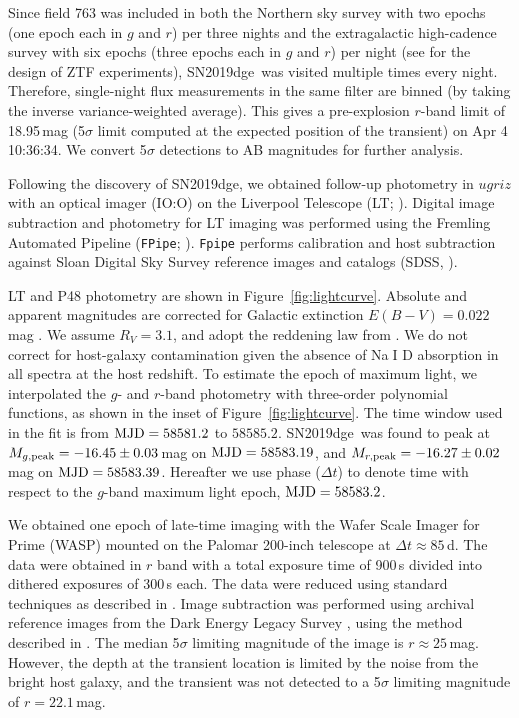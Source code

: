 \documentclass[twocolumn]{aastex63}
\newcommand{\name}{SN2019dge}
\def\ion#1#2{#1$\;${\footnotesize\rm{#2}}\relax}
\begin{document}
Since field 763 was included in both the Northern sky survey with two epochs (one epoch each in $g$ 
and $r$) per three nights and the extragalactic high-cadence survey with six epochs (three epochs 
each in $g$ and $r$) per night (see \citealt{Bellm2019a} for the design of ZTF experiments), \name\ was 
visited multiple times every night. Therefore, single-night flux measurements in the same 
filter are binned (by taking the inverse variance-weighted average). This gives a pre-explosion 
$r$-band limit of 18.95\,mag (5$\sigma$ limit computed at the expected position of the transient) on 
Apr 4 10:36:34. We convert 5$\sigma$ detections to AB magnitudes for further analysis.

Following the discovery of \name, we obtained follow-up photometry in $ugriz$ with an optical 
imager (IO:O) on the Liverpool Telescope (LT; \citealt{Steele2004}). Digital image subtraction and 
photometry for LT imaging was performed using the Fremling Automated Pipeline (\texttt{FPipe}; 
\citealt{Fremling2016}). \texttt{Fpipe} performs calibration and host subtraction against Sloan Digital 
Sky Survey reference images and catalogs (SDSS, \citealt{Alam2015}).

LT and P48 photometry are shown in Figure~\ref{fig:lightcurve}. Absolute and apparent magnitudes are 
corrected for Galactic extinction $E(B-V)=0.022$\,mag \citep{Schlafly2011}. We assume $R_V=3.1$, 
and adopt the reddening law from \citet{Cardelli1989}. We do not correct for host-galaxy 
contamination given the absence of \ion{Na}{I} D absorption in all spectra at the host redshift. To 
estimate the epoch of maximum light, we interpolated the $g$- and $r$-band photometry with 
three-order polynomial functions, as shown in the inset of Figure~\ref{fig:lightcurve}. The time 
window used in the fit is from ${\rm MJD}=58581.2$ to $58585.2$. \name\ was found to peak 
at $M_{g\rm , peak}=-16.45\pm0.03$\,mag on ${\rm MJD}=58583.19$, and $M_{r \rm ,peak} 
=-16.27\pm0.02$\,mag on ${\rm MJD}=58583.39$. Hereafter we use phase ($\Delta t$) to denote time
with respect to the $g$-band maximum light epoch, ${\rm MJD}=58583.2$.

We obtained one epoch of late-time imaging with the Wafer Scale Imager for Prime (WASP) mounted 
on the Palomar 200-inch telescope at $\Delta t \approx 85$\,d. The data were obtained 
in $r$ band with a total exposure time of 900\,s divided into dithered exposures of 300\,s each. The 
data were reduced using standard techniques as described in \citet{De2020a}. Image subtraction was 
performed using archival reference images from the Dark Energy Legacy Survey \citep{Dey2019}, using 
the method described in \citet{De2020b}. The median 5$\sigma$ limiting magnitude of the image is $r 
\approx 25$\,mag. However, the depth at the transient location is limited by the noise from the bright 
host galaxy, and the transient was not detected to a 5$\sigma$ limiting magnitude of $r = 22.1$\,mag. 
\end{document}

